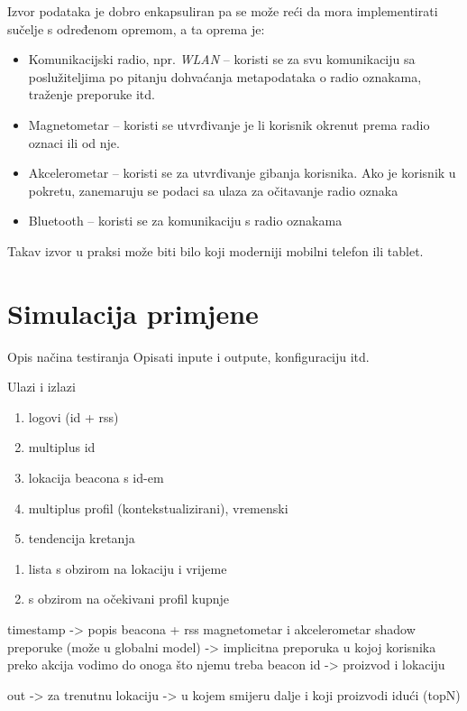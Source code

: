 \documentclass[times, utf8, diplomski, numeric]{fer}
\begin{document}
Izvor podataka je dobro enkapsuliran pa se može reći da mora implementirati
sučelje s određenom opremom, a ta oprema je:
\begin{itemize}
  \item Komunikacijski radio, npr. \emph{WLAN}  -- koristi
  se za svu komunikaciju sa poslužiteljima po pitanju dohvaćanja metapodataka o
  radio oznakama, traženje preporuke itd.
  \item Magnetometar -- koristi se utvrđivanje je li korisnik okrenut prema
  radio oznaci ili od nje. %
  \item Akcelerometar -- koristi se za utvrđivanje gibanja korisnika. Ako je
  korisnik u pokretu, zanemaruju se podaci sa ulaza za očitavanje radio oznaka
  \item Bluetooth -- koristi se za komunikaciju s radio oznakama
\end{itemize}

Takav izvor u praksi može biti bilo koji moderniji mobilni telefon ili tablet.

\section{Simulacija primjene}
Opis načina testiranja
Opisati inpute i outpute, konfiguraciju itd.

Ulazi i izlazi
\begin{enumerate}
  \item logovi (id + rss)
  \item multiplus id
  \item lokacija beacona s id-em
  \item multiplus profil (kontekstualizirani), vremenski
  \item tendencija kretanja
\end{enumerate}
\begin{enumerate}
  \item lista s obzirom na lokaciju i vrijeme
  \item s obzirom na očekivani profil kupnje
\end{enumerate}

timestamp -> popis beacona + rss
magnetometar i akcelerometar
shadow preporuke (može u globalni model) -> implicitna preporuka u kojoj korisnika
preko akcija vodimo do onoga što njemu treba
beacon id -> proizvod i lokaciju

out -> za trenutnu lokaciju -> u kojem smijeru dalje i koji proizvodi idući (topN)
\end{document}
